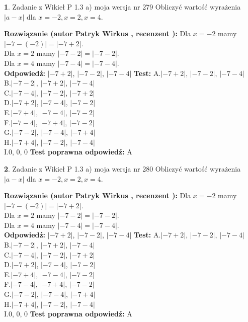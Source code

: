 \documentclass[12pt, a4paper]{article}
\theoremstyle{definition} %
\newtheorem{zad}{}
\newcommand{\zadStart}[1]{\begin{zad}#1\newline}
\newcommand{\zadStop}{\end{zad}}
\newcommand{\rozwStart}[2]{\noindent \textbf{Rozwiązanie (autor #1 , recenzent #2): }\newline}
\newcommand{\rozwStop}{\newline}
\newcommand{\odpStart}{\noindent \textbf{Odpowiedź:}\newline}
\newcommand{\odpStop}{\newline}
\newcommand{\testStart}{\noindent \textbf{Test:}\newline}
\newcommand{\testStop}{\newline}
\newcommand{\kluczStart}{\noindent \textbf{Test poprawna odpowiedź:}\newline}
\newcommand{\kluczStop}{\newline}
\begin{document}
\zadStart{Zadanie z Wikieł P 1.3 a) moja wersja nr 279}
Obliczyć wartość wyrażenia $|a - x|$ dla $x=-2,x=2,x=4$.
\zadStop
\rozwStart{Patryk Wirkus}{}
Dla $x = -2$ mamy $|-7 - (-2)| = |-7 + 2|$.\\
Dla $x = 2$ mamy $|-7 - 2| = |-7 - 2|$.\\
Dla $x = 4$ mamy $|-7 - 4| = |-7 - 4|$.\\
\rozwStop
\odpStart
$|-7 + 2|$, $|-7 - 2|$, $|-7 - 4|$
\odpStop
\testStart
A.$|-7 + 2|$, $|-7 - 2|$, $|-7 - 4|$\\
B.$|-7 - 2|$, $|-7 + 2|$, $|-7 - 4|$\\
C.$|-7 - 4|$, $|-7 - 2|$, $|-7 + 2|$\\
D.$|-7 + 2|$, $|-7 - 4|$, $|-7 - 2|$\\
E.$|-7 + 4|$, $|-7 - 4|$, $|-7 - 2|$\\
F.$|-7 - 4|$, $|-7 + 4|$, $|-7 - 2|$\\
G.$|-7 - 2|$, $|-7 - 4|$, $|-7 + 4|$\\
H.$|-7 + 4|$, $|-7 - 2|$, $|-7 - 4|$\\
I.$0$, $0$, $0$
\testStop
\kluczStart
A
\kluczStop



\zadStart{Zadanie z Wikieł P 1.3 a) moja wersja nr 280}
Obliczyć wartość wyrażenia $|a - x|$ dla $x=-2,x=2,x=4$.
\zadStop
\rozwStart{Patryk Wirkus}{}
Dla $x = -2$ mamy $|-7 - (-2)| = |-7 + 2|$.\\
Dla $x = 2$ mamy $|-7 - 2| = |-7 - 2|$.\\
Dla $x = 4$ mamy $|-7 - 4| = |-7 - 4|$.\\
\rozwStop
\odpStart
$|-7 + 2|$, $|-7 - 2|$, $|-7 - 4|$
\odpStop
\testStart
A.$|-7 + 2|$, $|-7 - 2|$, $|-7 - 4|$\\
B.$|-7 - 2|$, $|-7 + 2|$, $|-7 - 4|$\\
C.$|-7 - 4|$, $|-7 - 2|$, $|-7 + 2|$\\
D.$|-7 + 2|$, $|-7 - 4|$, $|-7 - 2|$\\
E.$|-7 + 4|$, $|-7 - 4|$, $|-7 - 2|$\\
F.$|-7 - 4|$, $|-7 + 4|$, $|-7 - 2|$\\
G.$|-7 - 2|$, $|-7 - 4|$, $|-7 + 4|$\\
H.$|-7 + 4|$, $|-7 - 2|$, $|-7 - 4|$\\
I.$0$, $0$, $0$
\testStop
\kluczStart
A
\kluczStop
\end{document}
